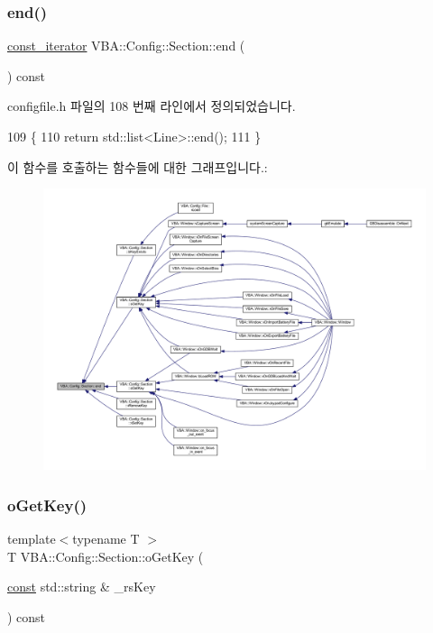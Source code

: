 \subsubsection{\texorpdfstring{end()}{end()}}
{\footnotesize\ttfamily \mbox{\hyperlink{class_v_b_a_1_1_config_1_1_section_a79d4303068448425b08175c0d2dacfab}{const\+\_\+iterator}} V\+B\+A\+::\+Config\+::\+Section\+::end (\begin{DoxyParamCaption}{ }\end{DoxyParamCaption}) const\hspace{0.3cm}{\ttfamily [inline]}}



configfile.\+h 파일의 108 번째 라인에서 정의되었습니다.


\begin{DoxyCode}
109     \{
110       \textcolor{keywordflow}{return} std::list<Line>::end();
111     \}
\end{DoxyCode}
이 함수를 호출하는 함수들에 대한 그래프입니다.\+:
\nopagebreak
\begin{figure}[H]
\begin{center}
\leavevmode
\includegraphics[width=350pt]{class_v_b_a_1_1_config_1_1_section_a15ff15ecb9f7f3aa0bb1c218d47f8829_icgraph}
\end{center}
\end{figure}
\mbox{\label{class_v_b_a_1_1_config_1_1_section_ab169d7aae4e9dde91418ba1668e3ad39}} 
\subsubsection{\texorpdfstring{o\+Get\+Key()}{oGetKey()}}
{\footnotesize\ttfamily template$<$typename T $>$ \\
T V\+B\+A\+::\+Config\+::\+Section\+::o\+Get\+Key (\begin{DoxyParamCaption}\item[{\mbox{\hyperlink{getopt1_8c_a2c212835823e3c54a8ab6d95c652660e}{const}} std\+::string \&}]{\+\_\+rs\+Key }\end{DoxyParamCaption}) const}



